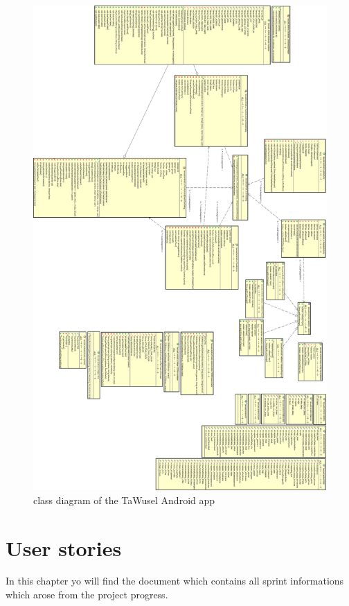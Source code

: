 \begin{figure}[h]
	\centering
	\includegraphics[height=.9\textheight]{images/Tawuseldroid_class}
	\caption{class diagram of the TaWusel Android app}
	\label{img:AndCl}
\end{figure}

\chapter{User stories}\label{chp:US}
In this chapter yo will find the document which contains all sprint informations which arose from the project progress.


